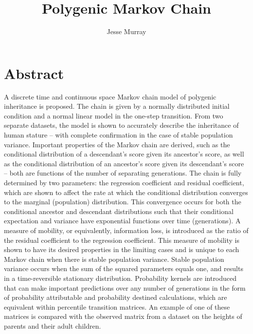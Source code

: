 \documentclass[letterpaper,10pt]{article} %
\title{Polygenic Markov Chain}
\author{Jesse Murray}
\date{}
\begin{document}
\maketitle





\section*{Abstract}
A discrete time and continuous space Markov chain model of polygenic inheritance is proposed. The chain is given by a normally distributed initial condition and a normal linear model in the one-step transition. From two separate datasets, the model is shown to accurately describe the inheritance of human stature -- with complete confirmation in the case of stable population variance. Important properties of the Markov chain are derived, such as the conditional distribution of a descendant's score given its ancestor's score, as well as the conditional distribution of an ancestor's score given its descendant's score -- both are functions of the number of separating generations. The chain is fully determined by two parameters: the regression coefficient and residual coefficient, which are shown to affect the rate at which the conditional distribution converges to the marginal (population) distribution. This convergence occurs for both the conditional ancestor and descendant distributions such that their conditional expectation and variance have exponential functions over time (generations). A measure of mobility, or equivalently, information loss, is introduced as the ratio of the residual coefficient to the regression coefficient. This measure of mobility is shown to have its desired properties in the limiting cases and is unique to each Markov chain when there is stable population variance. Stable population variance occurs when the sum of the squared parameters equals one, and results in a time-reversible stationary distribution. Probability kernels are introduced that can make important predictions over any number of generations in the form of probability attributable and probability destined calculations, which are equivalent within percentile transition matrices. An example of one of these matrices is compared with the observed matrix from a dataset on the heights of parents and their adult children.



\end{document}
